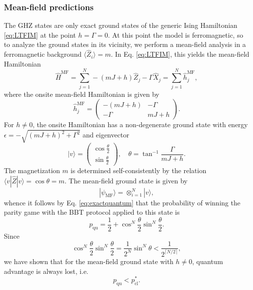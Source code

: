 \documentclass[prb,twocolumn,showpacs,amssymb,superscriptaddress]{revtex4-2}
\begin{document}
\subsubsection{Mean-field predictions}
\label{sec:MFP}
The GHZ states are only exact ground states of the generic Ising Hamiltonian \eqref{eq:LTFIM} at the point $h=\Gamma=0$. At this point the model is ferromagnetic, so to analyze the ground states in its vicinity, we perform a mean-field analysis in a ferromagnetic background $\langle \hat{Z}_i \rangle = m$. In Eq. \eqref{eq:LTFIM}, this yields the mean-field Hamiltonian
\begin{equation}
\hat{H}^{\mathrm{MF}} = \sum_{j=1}^N -(mJ +h)\hat{Z}_j -\Gamma \hat{X}_j = \sum_{j=1}^N \hat{h}_j^{\mathrm{MF}},
\end{equation}
where the onsite mean-field Hamiltonian is given by
\begin{equation}
\label{eq:onsite}
\hat{h}_j^{\mathrm{MF}} = \begin{pmatrix} -(mJ+h) & -\Gamma \\ -\Gamma & mJ+h \end{pmatrix}.
\end{equation}
For $h \neq 0$, the onsite Hamiltonian has a non-degenerate ground state with energy $\epsilon = -\sqrt{(mJ+h)^2 + \Gamma^2}$ and eigenvector
\begin{equation}
|v\rangle = \begin{pmatrix} \cos{\frac{\theta}{2}} \\ \sin{\frac{\theta}{2}} \end{pmatrix}, \quad \theta = \tan^{-1}{\frac{\Gamma}{mJ+h}}.
\end{equation}
The magnetization $m$ is determined self-consistently by the relation $\langle v| \hat{Z} |v\rangle = \cos{\theta} = m$. The mean-field ground state is given by
\begin{equation}
\label{eq:SBMF}
|\psi_{\mathrm{MF}} \rangle = \otimes_{i=1}^N |v\rangle,
\end{equation}
whence it follows by Eq. \eqref{eq:exactquantum} that the probability of winning the parity game with the BBT protocol applied to this state is
\begin{equation}
p_{\mathrm{qu}} = \frac{1}{2} + \cos^N{\frac{\theta}{2}}\sin^N{\frac{\theta}{2}}.
\end{equation}
Since
\begin{equation}
\cos^N{\frac{\theta}{2}}\sin^N{\frac{\theta}{2}} = \frac{1}{2^N} \sin^N{\theta} < \frac{1}{2^{\lceil N/2 \rceil}},
\end{equation}
we have shown that for the mean-field ground state with $h \neq 0$, quantum advantage is always lost, i.e.
\begin{equation}
p_{\mathrm{qu}} < p_{\mathrm{cl}}^*.
\end{equation}
\end{document}

